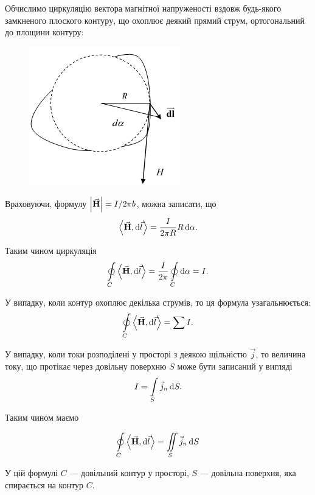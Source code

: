 Обчислимо циркуляцію вектора магнітної напруженості вздовж будь-якого замкненого плоского контуру, що охоплює деякий прямий струм, ортогональний до площини контуру:
\begin{figure}[H]
	\centering
	\includegraphics[width=.5\textwidth]{img/13-3.png}
\end{figure}

Враховуючи, формулу $\left| {\vec{\mathbf{H}}} \right| = I / 2 \pi b$, можна записати, що
\begin{equation}
	\langle \vecf H, \diff \vec l \rangle = \frac{I}{2 \pi R} R \diff \alpha.
\end{equation}

Таким чином циркуляція
\begin{equation}
	\Oint_C \langle \vecf H, \diff \vec l \rangle = \frac{I}{2 \pi} \Oint_C \diff \alpha = I.
\end{equation}

У випадку, коли контур охоплює декілька струмів, то ця формула узагальнюється:
\begin{equation}
	\Oint_C \langle \vecf H, \diff \vec l \rangle = \Sum I.
\end{equation}

У випадку, коли токи розподілені у просторі з деякою щільністю $\vec j$, то величина току, що протікає через довільну поверхню $S$ може бути записаний у вигляді
\begin{equation}
	I = \displaystyle\int\limits_S \vec j_n \mathop{}\!\mathrm{d} S.
\end{equation}

Таким чином маємо 
\begin{law}
	\begin{equation}
		\Oint_C \langle \vecf H, \diff \vec l \rangle = \Iint_S \vec j_n \diff S
	\end{equation}
\end{law}

У цій формулі $C$ --- довільний контур у просторі, $S$ --- довільна поверхня, яка спирається на контур $C$. \medskip

